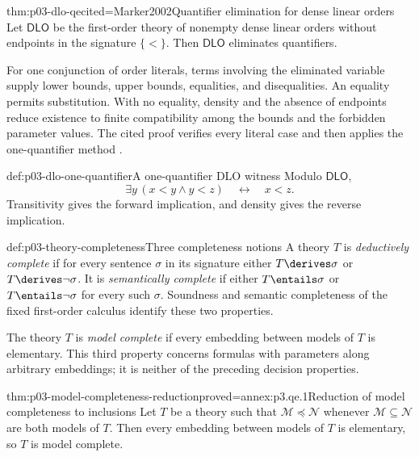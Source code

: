 \begin{hbtheorem}{thm:p03-dlo-qe}{cited=Marker2002}{Quantifier elimination for dense linear orders}
Let \(\mathsf{DLO}\) be the first-order theory of nonempty dense linear orders
without endpoints in the signature \(\{<\}\).  Then \(\mathsf{DLO}\)
eliminates quantifiers.
\end{hbtheorem}

For one conjunction of order literals, terms involving the eliminated
variable supply lower bounds, upper bounds, equalities, and disequalities.  An
equality permits substitution.  With no equality, density and the absence of
endpoints reduce existence to finite compatibility among the bounds and the
forbidden parameter values.  The cited proof verifies every literal case and
then applies the one-quantifier method \cite{Marker2002}.

\begin{hbexample}{def:p03-dlo-one-quantifier}{A one-quantifier DLO witness}
Modulo \(\mathsf{DLO}\),
\[
  \exists y\,(x<y\land y<z)\quad\leftrightarrow\quad x<z.
\]
Transitivity gives the forward implication, and density gives the reverse
implication.
\end{hbexample}

\begin{hbdefinition}{def:p03-theory-completeness}{Three completeness notions}
A theory \(T\) is \emph{deductively complete} if for every sentence \(\sigma\)
in its signature either \(T\derives\sigma\) or \(T\derives\neg\sigma\).  It is
\emph{semantically complete} if either \(T\entails\sigma\) or
\(T\entails\neg\sigma\) for every such \(\sigma\).  Soundness and semantic
completeness of the fixed first-order calculus identify these two properties.

The theory \(T\) is \emph{model complete} if every embedding between models
of \(T\) is elementary.  This third property concerns formulas with parameters
along arbitrary embeddings; it is neither of the preceding decision
properties.
\end{hbdefinition}

\begin{hblemma}{thm:p03-model-completeness-reduction}{proved=annex:p3.qe.1}{Reduction of model completeness to inclusions}
Let \(T\) be a theory such that \(\mathcal M\preccurlyeq\mathcal N\) whenever
\(\mathcal M\subseteq\mathcal N\) are both models of \(T\).  Then every
embedding between models of \(T\) is elementary, so \(T\) is model complete.
\end{hblemma}

